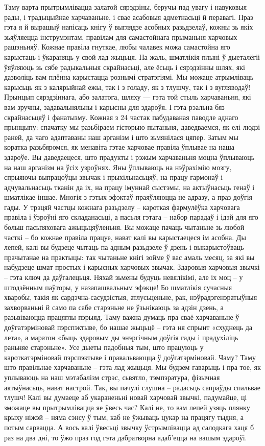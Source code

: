 Таму варта прытрымлівацца залатой сярэдзіны, беручы пад увагу і навуковыя рады, і традыцыйнае харчаваньне, і свае асабовыя адметнасьці й перавагі. Праз гэта я й вырашыў напісаць кнігу ў выглядзе асобных разьдзелаў, кожны зь якіх зьяўляецца інструмэнтам, правілам для самастойнага прыманьня харчовых рашэньняў. Кожнае правіла гнуткае, любы чалавек можа самастойна яго карыстаць і ўкараняць у свой лад жыцьця. На жаль, шматлікія плыні ў дыеталёгіі ўяўляюць зь сябе радыкальныя скрайнасьці, але ёсьць і сярэдзінны шлях, які дазволіць вам плённа карыстацца рознымі стратэгіямі. Мы можаце атрымліваць карысьць як з калярыйнай ежы, так і з голаду, як з тлушчу, так і з вугляводаў! Прынцып сярэдзіннага, або залатога, шляху — гэта той стыль харчаваньня, які вам зручны, задавальняльны і карысны для здароўя. І гэта рэальна бяз скрайнасьцяў і фанатызму.
Кожная з 24 частак пабудаваная паводле аднаго прынцыпу: спачатку мы разьбіраем гісторыю пытаньня, даведваемся, як елі людзі раней, да чаго адаптаваны наш арганізм і што зьмянілася цяпер. Затым мы коратка разьбяромся, як менавіта гэтае харчовае правіла ўплывае на наша здароўе. Вы даведаецеся, што прадукты і рэжым харчаваньня моцна ўплываюць на наш арганізм на ўсіх узроўнях. Яны ўплываюць на нэўрахімію мозгу, спрыяючы выпрацоўцы звычак і прыхільнасьцяў, на працу гармонаў і адчувальнасьць тканін да іх, на працу імуннай сыстэмы, на актыўнасьць генаў і шматлікае іншае. Многія з гэтых эфэктаў праяўляюцца не адразу, а праз доўгія гады. У трэцяй частцы кожнага разьдзелу – кароткая фармулёўка харчовага правіла і ўзроўні яго складанасьці, а пасьля гэтага – набор парадаў і ідэй для яго больш пасьпяховага ажыцьцяўленьня. Вы можаце пачаць чытаньне зь любой часткі – бо кожнае правіла працуе, нават калі вы карыстаецеся ім асобна. Ды лепей, калі вы будзеце чытаць па адным разьдзеле ў дзень і выкарыстоўваць прачытанае на практыцы: так чытаньне кнігі зойме ў вас амаль месяц, за які вы набудзеце шмат простых і карысных харчовых звычак.
Здаровыя харчовыя звычкі – гэта ключ да даўгалецьця. Няхай зьмены будуць невялікімі, але іх моц – у штодзённым паўторы, у назапашвальным эфэкце! Бо шматлікія сучасныя хваробы, такія як сардэчна-сасудзістыя, атлусьценьне, рак, нэўрадэгенэратыўныя захворваньні й само па сабе старэньне не ўзьнікаюць за адзін дзень, а разьвіваюцца працяглы пэрыяд. Таму важна думаць пра сваё харчаваньне ў доўгатэрміновай пэрспэктыве, бо нашае жыцьцё – гэта ня спрынт «схуднець да лета», а маратон «быць здаровым ды энэргічным доўгія гады і прадухіліць раньняе старэньне». Усе дыеты падобныя тым, што працуюць у кароткатэрміновай пэрспэктыве і правальваюцца ў доўгатэрміновай. Чаму? Таму што правільнае харчаваньне – гэта лад жыцьця. Мы будзем гаварыць і пра тое, як уплываюць на наш мэтабалізм стрэс, сьвятло, тэмпэратура, фізычная актыўнасьць, нават настрой. Так, вы пачулі слушна – радасьць сапраўды спальвае тлушч! Калі вы думаеце аб укараненьні новай харчовай звычкі, падумайце, ці зможаце вы прытрымлівацца яе ўвесь час? Калі не, то вам лепей узяць плянку крыху ніжэй – няма сэнсу ў тым, каб не ўжываць цукар на працягу тыдня, а потым сарвацца. А вось калі ўвесьці звычку ўстрымлівацца ад салодкага хаця б раз на два дні, то ўжо праз год гэта дабратворна адаб'ецца на вашым здароўі.
